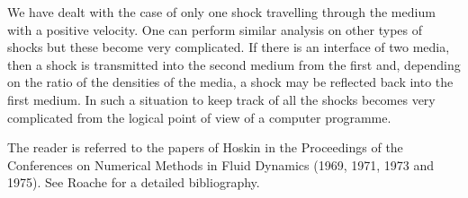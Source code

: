 \begin{remark}\label{chap9:rem9.6}
We have dealt with the case of only one shock travelling through the medium with a positive velocity. One can perform similar analysis on other types of shocks but these become very complicated. If there is an interface of two media, then a shock is transmitted into the second medium from the first and, depending on the ratio of the densities of the media, a shock may be reflected back into the first medium. In such a situation to keep track of all the shocks becomes very complicated from the logical point of view of a computer programme. 
\end{remark}

\medskip
{}
The reader is referred to the papers of Hoskin in the Proceedings of the Conferences on Numerical Methods in Fluid Dynamics (1969, 1971, 1973 and 1975). See Roache \cite{key33} for a detailed bibliography.
